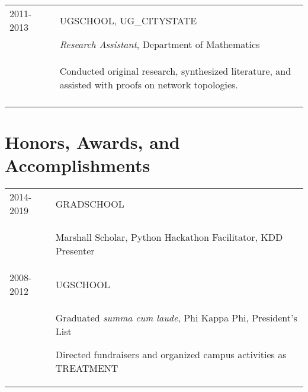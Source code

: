 \documentclass[a4paper,10pt]{article}
\begin{document}
\begin{supertabular}{l p{0.55cm} p{13.9cm}}
	\textsc{2011-2013}		&& \textsc{UGSCHOOL}, UG_CITYSTATE \\
	\textsc{}							&& \small	\emph{Research Assistant}, Department of Mathematics \\
												&& \begin{enumerate*}[label =$\circ$, itemjoin={\newline}]
														\item \footnotesize Conducted original research, synthesized literature, and assisted with proofs on network topologies.
														\end{enumerate*} \\
	 \\


\end{supertabular}





\section{Honors, Awards, and Accomplishments}
\begin{supertabular}{p{3.4cm} p{13.9cm}}

	\textsc{2014-2019} 				& \textsc{GRADSCHOOL} \\
														& \begin{enumerate*}[label =$\circ$, itemjoin={\newline}]
																\item \footnotesize Marshall Scholar, Python Hackathon Facilitator, KDD Presenter
																\end{enumerate*} \vspace{2mm} \\

	\textsc{2008-2012} 				& \textsc{UGSCHOOL} \\
														& \begin{enumerate*}[label =$\circ$, itemjoin={\newline}]
																\item \footnotesize  Graduated \emph{summa cum laude}, Phi Kappa Phi, President's List
																\item \footnotesize  Directed fundraisers and organized campus activities as TREATMENT
																\end{enumerate*} \vspace{2mm} \\



\end{supertabular}
\end{document}

